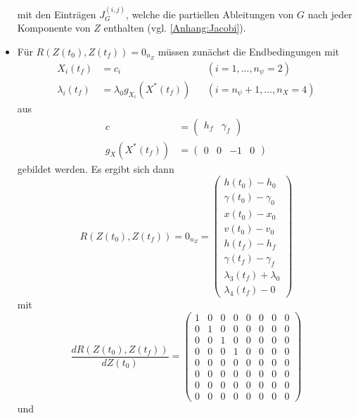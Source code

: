 \begin{itemize}
mit den Einträgen \(J_G^{(i,j)}\), welche die partiellen Ableitungen von \(G\) nach jeder Komponente von \(Z\) enthalten (vgl. \autoref{Anhang:Jacobi}).
%
\item Für $R(Z(t_0),Z(t_f)) = 0_{n_Z}$ müssen zunächst die Endbedingungen mit
\begin{align*}
X_i(t_f) &= c_i & & (i=1,...,n_{\psi}=2) \\
\lambda_i(t_f) &= \lambda_0 g_{X_i}(X^{\ast}(t_f)) & &(i=n_{\psi}+1,...,n_X=4)
\end{align*}
aus
\begin{align*}
c &= \begin{pmatrix} h_f & \gamma_f \end{pmatrix} \\
g_{X}(X^{\ast}(t_f)) &= \begin{pmatrix} 0 & 0 & -1 & 0 \end{pmatrix}
\end{align*}
gebildet werden. Es ergibt sich dann
\begin{equation}
R(Z(t_0),Z(t_f)) = 0_{n_Z} = \begin{pmatrix}
h(t_0) - h_0 \\ 
\gamma(t_0) - \gamma_0 \\
x(t_0) - x_0 \\ 
v(t_0) - v_0 \\ 
h(t_f) - h_f \\ 
\gamma(t_f) - \gamma_f \\
\lambda_3(t_f) + \lambda_0 \\ 
\lambda_4(t_f) - 0
\end{pmatrix}
\end{equation}
mit 
\begin{equation}\label{func:RZt0}
\dfrac{d R(Z(t_0),Z(t_f))}{d Z(t_0)} = \begin{pmatrix}
1 & 0 & 0 & 0 & 0 & 0 & 0 & 0 \\ 
0 & 1 & 0 & 0 & 0 & 0 & 0 & 0 \\ 
0 & 0 & 1 & 0 & 0 & 0 & 0 & 0 \\ 
0 & 0 & 0 & 1 & 0 & 0 & 0 & 0 \\
0 & 0 & 0 & 0 & 0 & 0 & 0 & 0 \\
0 & 0 & 0 & 0 & 0 & 0 & 0 & 0 \\
0 & 0 & 0 & 0 & 0 & 0 & 0 & 0 \\
0 & 0 & 0 & 0 & 0 & 0 & 0 & 0
\end{pmatrix}
\end{equation}
und
\begin{equation}\label{func:RZtf}

\end{equation}
\end{itemize}
